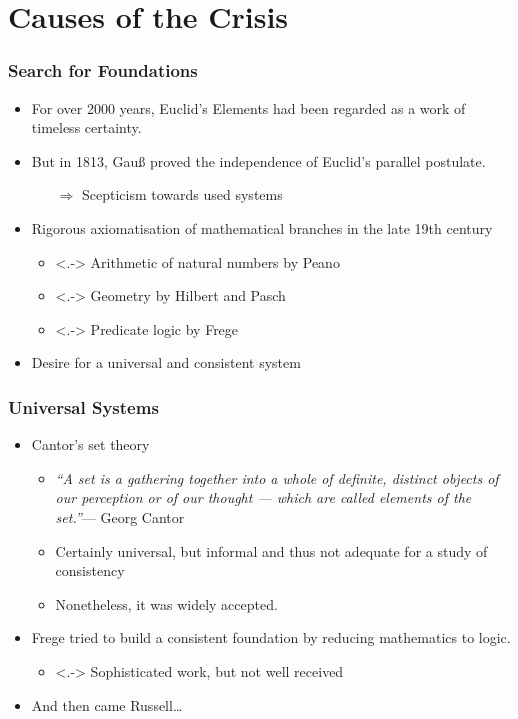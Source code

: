 \documentclass{beamer}
\begin{document}
\section{Causes of the Crisis}
\begin{frame}
    \frametitle{Search for Foundations}
    \begin{itemize}[<+->]
	\item For over 2000 years, Euclid's Elements had been regarded as a work of timeless certainty.
	\item But in 1813, Gauß proved the independence of Euclid's parallel postulate.
	\begin{itemize}
		\item[$\Rightarrow$] Scepticism towards used systems
	\end{itemize}
	\item Rigorous axiomatisation of mathematical branches in the late 19th century
	\begin{itemize}
		\item<.-> Arithmetic of natural numbers by Peano
		\item<.-> Geometry by Hilbert and Pasch
		\item<.-> Predicate logic by Frege
	\end{itemize}
	\item Desire for a universal and consistent system
    \end{itemize}
\end{frame}
\begin{frame}
    \frametitle{Universal Systems}
    \begin{itemize}[<+->]
	\item Cantor's set theory
	\begin{itemize}
		\item \textit{``A set is a gathering together into a whole of definite, distinct objects of our perception or of our thought --- which are called elements of the set.''}\nocite{cantor_set}\hfill--- Georg Cantor
		\item Certainly universal, but informal and thus not adequate for a study of consistency
		\item Nonetheless, it was widely accepted.
	\end{itemize}
	\item Frege tried to build a consistent foundation by reducing mathematics to logic.
	\begin{itemize}
		\item<.-> Sophisticated work, but not well received
	\end{itemize}
	\item And then came Russell\ldots
    \end{itemize}
\end{frame}
\end{document}
